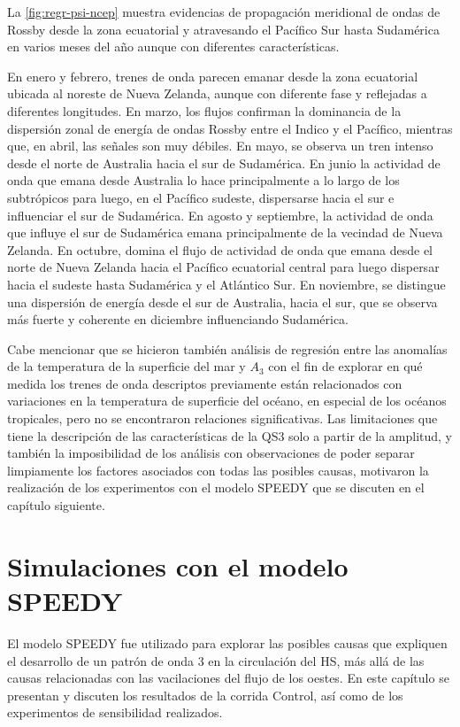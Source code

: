\documentclass[spanish,a4paper,12pt,oneside]{book}
\begin{document}
La \autoref{fig:regr-psi-ncep} muestra evidencias de propagación
meridional de ondas de Rossby desde la zona ecuatorial y atravesando el
Pacífico Sur hasta Sudamérica en varios meses del año aunque con
diferentes características.

En enero y febrero, trenes de onda parecen emanar desde la zona
ecuatorial ubicada al noreste de Nueva Zelanda, aunque con diferente
fase y reflejadas a diferentes longitudes. En marzo, los flujos
confirman la dominancia de la dispersión zonal de energía de ondas
Rossby entre el Indico y el Pacífico, mientras que, en abril, las
señales son muy débiles. En mayo, se observa un tren intenso desde el
norte de Australia hacia el sur de Sudamérica. En junio la actividad de
onda que emana desde Australia lo hace principalmente a lo largo de los
subtrópicos para luego, en el Pacífico sudeste, dispersarse hacia el sur
e influenciar el sur de Sudamérica. En agosto y septiembre, la actividad
de onda que influye el sur de Sudamérica emana principalmente de la
vecindad de Nueva Zelanda. En octubre, domina el flujo de actividad de
onda que emana desde el norte de Nueva Zelanda hacia el Pacífico
ecuatorial central para luego dispersar hacia el sudeste hasta
Sudamérica y el Atlántico Sur. En noviembre, se distingue una dispersión
de energía desde el sur de Australia, hacia el sur, que se observa más
fuerte y coherente en diciembre influenciando Sudamérica.

Cabe mencionar que se hicieron también análisis de regresión entre las
anomalías de la temperatura de la superficie del mar y \(A_3\) con el
fin de explorar en qué medida los trenes de onda descriptos previamente
están relacionados con variaciones en la temperatura de superficie del
océano, en especial de los océanos tropicales, pero no se encontraron
relaciones significativas. Las limitaciones que tiene la descripción de
las características de la QS3 solo a partir de la amplitud, y también la
imposibilidad de los análisis con observaciones de poder separar
limpiamente los factores asociados con todas las posibles causas,
motivaron la realización de los experimentos con el modelo SPEEDY que se
discuten en el capítulo siguiente.

\chapter{Simulaciones con el modelo
SPEEDY}\label{simulaciones-con-el-modelo-speedy}

El modelo SPEEDY fue utilizado para explorar las posibles causas que
expliquen el desarrollo de un patrón de onda 3 en la circulación del HS,
más allá de las causas relacionadas con las vacilaciones del flujo de
los oestes. En este capítulo se presentan y discuten los resultados de
la corrida Control, así como de los experimentos de sensibilidad
realizados.
\end{document}
